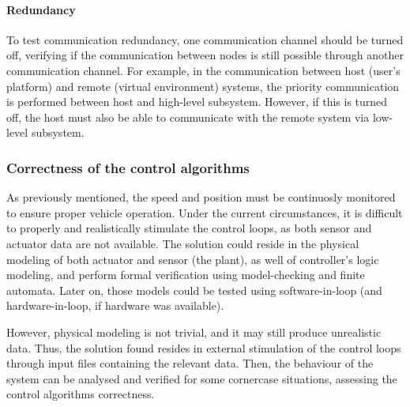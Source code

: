 \paragraph{Redundancy}%
\label{sec:redundancy-test}
To test communication redundancy, one communication channel should be turned
off, verifying if the communication between nodes is still possible through
another communication channel. For example, in the communication between host
(user's platform) and remote (virtual environment) systems, the priority
communication is performed between host and high-level subsystem. However, if
this is turned off, the host must also be able to communicate with the remote
system via low-level subsystem.

\subsubsection{Correctness of the control algorithms}%
\label{sec:correct-control-algorithms-test}
As previously mentioned, the speed and position must be continuosly monitored
to ensure proper vehicle operation. Under the current circumstances, it is
difficult to properly and realistically stimulate the control loops, as both
sensor and actuator data are not available. The solution could reside in the
physical modeling of both actuator and sensor (the plant), as well of
controller's logic modeling, and perform formal verification
using model-checking and finite automata. Later on, those models could be tested
using software-in-loop (and hardware-in-loop, if hardware was available). 

However, physical modeling is not trivial, and it may still produce unrealistic
data. Thus, the solution found resides in external stimulation of the control
loops through input files containing the relevant data. Then, the behaviour of
the system can be analysed and verified for some cornercase situations,
assessing the control algorithms correctness.
%
%
%

